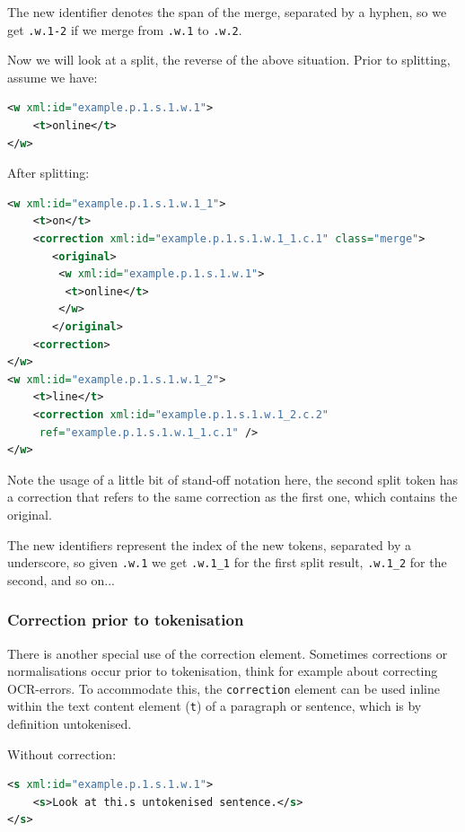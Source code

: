 \documentclass[a4paper,12pt]{report}
\begin{document}
The new identifier denotes the span of the merge, separated by a hyphen, so we get \texttt{.w.1-2} if we merge from \texttt{.w.1} to \texttt{.w.2}.

Now we will look at a split, the reverse of the above situation. Prior to splitting, assume we have:

\begin{lstlisting}[language=xml]
<w xml:id="example.p.1.s.1.w.1">
    <t>online</t>
</w>                         
\end{lstlisting}

After splitting:

\begin{lstlisting}[language=xml]
<w xml:id="example.p.1.s.1.w.1_1">
    <t>on</t>
    <correction xml:id="example.p.1.s.1.w.1_1.c.1" class="merge">
       <original>
        <w xml:id="example.p.1.s.1.w.1">
         <t>online</t>
        </w>       
       </original>
    <correction>
</w>
<w xml:id="example.p.1.s.1.w.1_2">
    <t>line</t>
    <correction xml:id="example.p.1.s.1.w.1_2.c.2" 
     ref="example.p.1.s.1.w.1_1.c.1" />
</w>
\end{lstlisting}

Note the usage of a little bit of stand-off notation here, the second split token has a correction that refers to the same correction as the first one, which contains the original.

The new identifiers represent the index of the new tokens, separated by a underscore, so given \texttt{.w.1}  we get \texttt{.w.1\_1} for the first split result, \texttt{.w.1\_2} for the second, and so on...


\subsubsection{Correction prior to tokenisation} 

There is another special use of the correction element. Sometimes corrections or normalisations occur prior to tokenisation, think for example about correcting OCR-errors. To accommodate this, the \texttt{correction} element can be used inline within the text content element (\texttt{t}) of a paragraph or sentence, which is by definition untokenised.

Without correction:

\begin{lstlisting}[language=xml]
<s xml:id="example.p.1.s.1.w.1">
    <s>Look at thi.s untokenised sentence.</s>
</s>            
\end{lstlisting}
\end{document}

